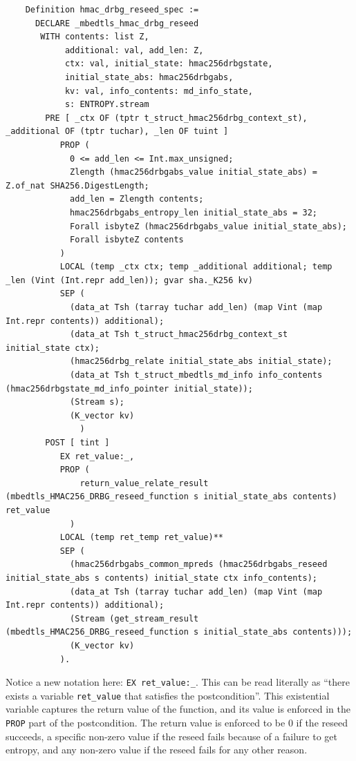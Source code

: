 \documentclass[pageno]{jpaper}
\begin{document}
\begin{lstlisting}
    Definition hmac_drbg_reseed_spec :=
      DECLARE _mbedtls_hmac_drbg_reseed
       WITH contents: list Z,
            additional: val, add_len: Z,
            ctx: val, initial_state: hmac256drbgstate,
            initial_state_abs: hmac256drbgabs,
            kv: val, info_contents: md_info_state,
            s: ENTROPY.stream
        PRE [ _ctx OF (tptr t_struct_hmac256drbg_context_st), _additional OF (tptr tuchar), _len OF tuint ]
           PROP (
             0 <= add_len <= Int.max_unsigned;
             Zlength (hmac256drbgabs_value initial_state_abs) = Z.of_nat SHA256.DigestLength;
             add_len = Zlength contents;
             hmac256drbgabs_entropy_len initial_state_abs = 32;
             Forall isbyteZ (hmac256drbgabs_value initial_state_abs);
             Forall isbyteZ contents
           )
           LOCAL (temp _ctx ctx; temp _additional additional; temp _len (Vint (Int.repr add_len)); gvar sha._K256 kv)
           SEP (
             (data_at Tsh (tarray tuchar add_len) (map Vint (map Int.repr contents)) additional);
             (data_at Tsh t_struct_hmac256drbg_context_st initial_state ctx);
             (hmac256drbg_relate initial_state_abs initial_state);
             (data_at Tsh t_struct_mbedtls_md_info info_contents (hmac256drbgstate_md_info_pointer initial_state));
             (Stream s);
             (K_vector kv)
               )
        POST [ tint ]
           EX ret_value:_,
           PROP (
               return_value_relate_result (mbedtls_HMAC256_DRBG_reseed_function s initial_state_abs contents) ret_value
             )
           LOCAL (temp ret_temp ret_value)**
           SEP (
             (hmac256drbgabs_common_mpreds (hmac256drbgabs_reseed initial_state_abs s contents) initial_state ctx info_contents);
             (data_at Tsh (tarray tuchar add_len) (map Vint (map Int.repr contents)) additional);
             (Stream (get_stream_result (mbedtls_HMAC256_DRBG_reseed_function s initial_state_abs contents)));
             (K_vector kv)
           ).
\end{lstlisting}

Notice a new notation here: \lstinline{EX ret_value:_}. This can be read literally as “there exists a variable \lstinline{ret_value} that satisfies the postcondition”. This existential variable captures the return value of the function, and its value is enforced in the \lstinline{PROP} part of the postcondition. The return value is enforced to be 0 if the reseed succeeds, a specific non-zero value if the reseed fails because of a failure to get entropy, and any non-zero value if the reseed fails for any other reason.
\end{document}
